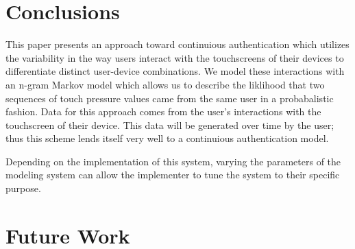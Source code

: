 \documentclass{acm_proc_article-sp}
\begin{document}
\section{Conclusions}
\label{sec:conclusions}
This paper presents an approach toward continuious authentication which utilizes the variability in the way users interact with the touchscreens of their devices to differentiate distinct user-device combinations. We model these interactions with an n-gram Markov model which allows us to describe the liklihood that two sequences of touch pressure values came from the same user in a probabalistic fashion. Data for this approach comes from the user's interactions with the touchscreen of their device. This data will be generated over time by the user; thus this scheme lends itself very well to a continuious authentication model.

Depending on the implementation of this system, varying the parameters of the modeling system can allow the implementer to tune the system to their specific purpose. 

\section{Future Work}
\label{sec:futurework}



\end{document}
